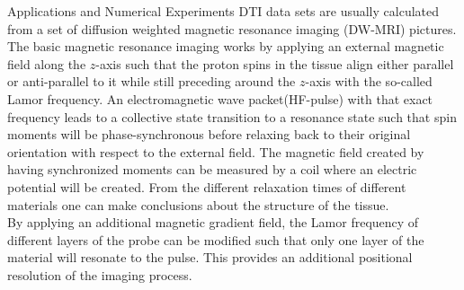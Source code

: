 \begin{chapter}{Applications and Numerical Experiments}
DTI data sets are usually calculated from a set of diffusion weighted magnetic resonance imaging (DW-MRI) pictures. The basic magnetic resonance imaging works by applying an external magnetic field along
the $z$-axis such that the proton spins in the tissue align either parallel or anti-parallel to it while still preceding around the $z$-axis with the so-called Lamor frequency.
An electromagnetic wave packet(HF-pulse) with that exact frequency leads to a collective state transition to a resonance state such that spin moments will be phase-synchronous before relaxing
back to their original orientation with respect to the external field. The magnetic field created by having synchronized moments can be measured by a coil where an electric potential will be created.
From the different relaxation times of different materials one can make conclusions about the structure of the tissue.\\

By applying an additional magnetic gradient field, the Lamor frequency of different layers of the probe can be modified such that only one layer of the material will resonate to the pulse.
This provides an additional positional resolution of the imaging process.\\


\end{chapter}
